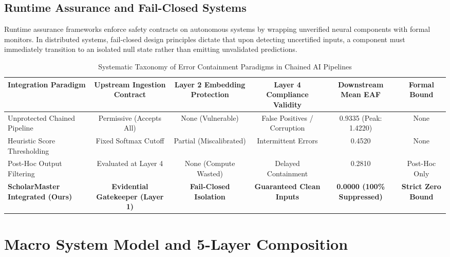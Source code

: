 \documentclass[10pt,journal,compsoc]{IEEEtran}
\begin{document}
\subsection{Runtime Assurance and Fail-Closed Systems}
Runtime assurance frameworks \cite{seshia2022toward} enforce safety contracts on autonomous systems by wrapping unverified neural components with formal monitors. In distributed systems, fail-closed design principles dictate that upon detecting uncertified inputs, a component must immediately transition to an isolated null state rather than emitting unvalidated predictions.

\begin{table}[t]
\caption{Systematic Taxonomy of Error Containment Paradigms in Chained AI Pipelines}
\label{tab:eaf_taxonomy}
\centering
\begin{tabular}{lccccc}
\toprule
\textbf{Integration Paradigm} & \textbf{Upstream Ingestion Contract} & \textbf{Layer 2 Embedding Protection} & \textbf{Layer 4 Compliance Validity} & \textbf{Downstream Mean EAF} & \textbf{Formal Bound} \\
\midrule
Unprotected Chained Pipeline & Permissive (Accepts All) & None (Vulnerable) & False Positives / Corruption & 0.9335 (Peak: 1.4220) & None \\
Heuristic Score Thresholding & Fixed Softmax Cutoff & Partial (Miscalibrated) & Intermittent Errors & 0.4520 & None \\
Post-Hoc Output Filtering & Evaluated at Layer 4 & None (Compute Wasted) & Delayed Containment & 0.2810 & Post-Hoc Only \\
\textbf{ScholarMaster Integrated (Ours)} & \textbf{Evidential Gatekeeper (Layer 1)} & \textbf{Fail-Closed Isolation} & \textbf{Guaranteed Clean Inputs} & \textbf{0.0000 (100\% Suppressed)} & \textbf{Strict Zero Bound} \\
\bottomrule
\end{tabular}
\end{table}

\section{Macro System Model and 5-Layer Composition}
\end{document}
